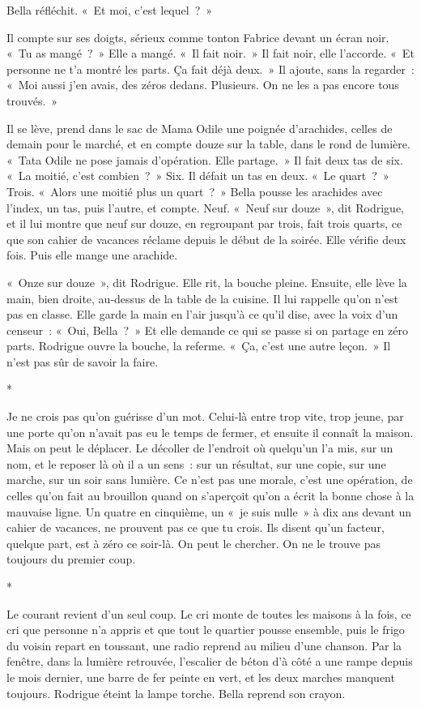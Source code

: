 \documentclass[10.5pt,twoside,openright]{book}
\newcommand{\asterisme}{\par\vspace{0.7em}\centerline{\color{gris}*\quad*\quad*}\vspace{0.7em}\par\noindent}
\begin{document}
Bella réfléchit. « Et moi, c’est lequel ? »

Il compte sur ses doigts, sérieux comme tonton Fabrice devant un écran noir. « Tu as mangé ? » Elle a mangé. « Il fait noir. » Il fait noir, elle l’accorde. « Et personne ne t’a montré les parts. Ça fait déjà deux. » Il ajoute, sans la regarder : « Moi aussi j’en avais, des zéros dedans. Plusieurs. On ne les a pas encore tous trouvés. »

Il se lève, prend dans le sac de Mama Odile une poignée d’arachides, celles de demain pour le marché, et en compte douze sur la table, dans le rond de lumière. « Tata Odile ne pose jamais d’opération. Elle partage. » Il fait deux tas de six. « La moitié, c’est combien ? » Six. Il défait un tas en deux. « Le quart ? » Trois. « Alors une moitié plus un quart ? » Bella pousse les arachides avec l’index, un tas, puis l’autre, et compte. Neuf. « Neuf sur douze », dit Rodrigue, et il lui montre que neuf sur douze, en regroupant par trois, fait trois quarts, ce que son cahier de vacances réclame depuis le début de la soirée. Elle vérifie deux fois. Puis elle mange une arachide.

« Onze sur douze », dit Rodrigue. Elle rit, la bouche pleine. Ensuite, elle lève la main, bien droite, au-dessus de la table de la cuisine. Il lui rappelle qu’on n’est pas en classe. Elle garde la main en l’air jusqu’à ce qu’il dise, avec la voix d’un censeur : « Oui, Bella ? » Et elle demande ce qui se passe si on partage en zéro parts. Rodrigue ouvre la bouche, la referme. « Ça, c’est une autre leçon. » Il n’est pas sûr de savoir la faire.

\asterisme

Je ne crois pas qu’on guérisse d’un mot. Celui-là entre trop vite, trop jeune, par une porte qu’on n’avait pas eu le temps de fermer, et ensuite il connaît la maison. Mais on peut le déplacer. Le décoller de l’endroit où quelqu’un l’a mis, sur un nom, et le reposer là où il a un sens : sur un résultat, sur une copie, sur une marche, sur un soir sans lumière. Ce n’est pas une morale, c’est une opération, de celles qu’on fait au brouillon quand on s’aperçoit qu’on a écrit la bonne chose à la mauvaise ligne. Un quatre en cinquième, un « je suis nulle » à dix ans devant un cahier de vacances, ne prouvent pas ce que tu crois. Ils disent qu’un facteur, quelque part, est à zéro ce soir-là. On peut le chercher. On ne le trouve pas toujours du premier coup.

\asterisme

Le courant revient d’un seul coup. Le cri monte de toutes les maisons à la fois, ce cri que personne n’a appris et que tout le quartier pousse ensemble, puis le frigo du voisin repart en toussant, une radio reprend au milieu d’une chanson. Par la fenêtre, dans la lumière retrouvée, l’escalier de béton d’à côté a une rampe depuis le mois dernier, une barre de fer peinte en vert, et les deux marches manquent toujours. Rodrigue éteint la lampe torche. Bella reprend son crayon.
\end{document}
